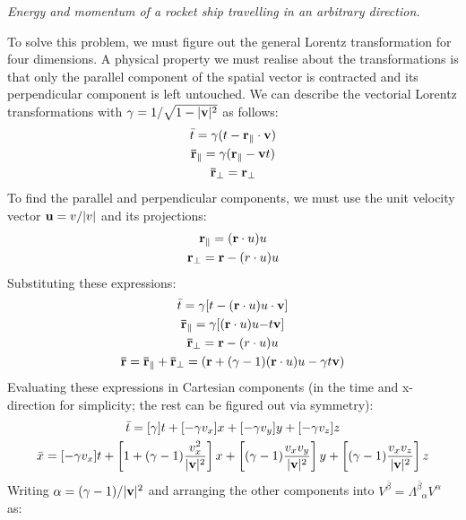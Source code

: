 \documentclass{report}
\begin{document}
\begin{subquests}
	\item \emph{Energy and momentum of a rocket ship travelling in an arbitrary direction.}
	\begin{subquests}
		\item
		To solve this problem, we must figure out the general Lorentz transformation for four dimensions. A physical property we must realise about the transformations is that only the parallel component of the spatial vector is contracted and its perpendicular component is left untouched. We can describe the vectorial Lorentz transformations with $\gamma = 1/\sqrt {1-|{\vb v}|^2}$ as follows:
		\begin{gather*}
			\bar t = \gamma (t - {\vb r}_{\parallel}\cdot {\vb v}) \\
			{\vb {\bar r}}_{\parallel} = \gamma ({\vb r}_{\parallel} - {\vb v} t) \\
			{\vb {\bar r}}_{\perp} = {\vb r}_{\perp}
		\end{gather*}
		To find the parallel and perpendicular components, we must use the unit velocity vector $\vb u = v/|v|$ and its projections:
		\begin{gather*}
			{\vb r}_{\parallel} = (\vb r \cdot u)u \\
			{\vb r}_{\perp} = \vb r - (r \cdot u)u
		\end{gather*}
		Substituting these expressions:
		\begin{gather*}
			{\bar t} = \gamma [t - (\vb r \cdot u)u \cdot {\vb v}] \\
			\vb{\bar r}_{\parallel} = \gamma [({\vb r \cdot u)u -} t{\vb v}]  \\
			\vb{\bar r}_{\perp} = \vb r - (r \cdot u)u \\
			\vb{\bar{r}} = \vb{\bar{r}}_{\parallel} +\vb{\bar r}_{\perp} = \pqty{\vb r + (\gamma -1)(\vb r \cdot u)u - \gamma t\vb v}
		\end{gather*}
		Evaluating these expressions in Cartesian components (in the time and x-direction for simplicity; the rest can be figured out via symmetry):
		\begin{gather*}
			{\bar t} = [\gamma]t + [-\gamma v_x] x  + [-\gamma v_y] y + [-\gamma v_z] z \\
			\bar x = [-\gamma v_x] t + \left[1 + (\gamma -1)\frac{v_x^2}{|{\vb v}|^2}\right]x + \left[(\gamma - 1)\frac{v_x v_y}{|{\vb v}|^2}\right]y	+ \left[(\gamma - 1)\frac{v_x v_z}{|{\vb v}|^2}\right]z
		\end{gather*}
		Writing $\alpha = (\gamma -1)/|{\vb v}|^2$ and arranging the other components into $ V^{\bar \beta} = \Lambda^{\bar \beta}_{\;\;\alpha} V^{\alpha}$ as:

\end{subquests}
\end{subquests}
\end{document}
